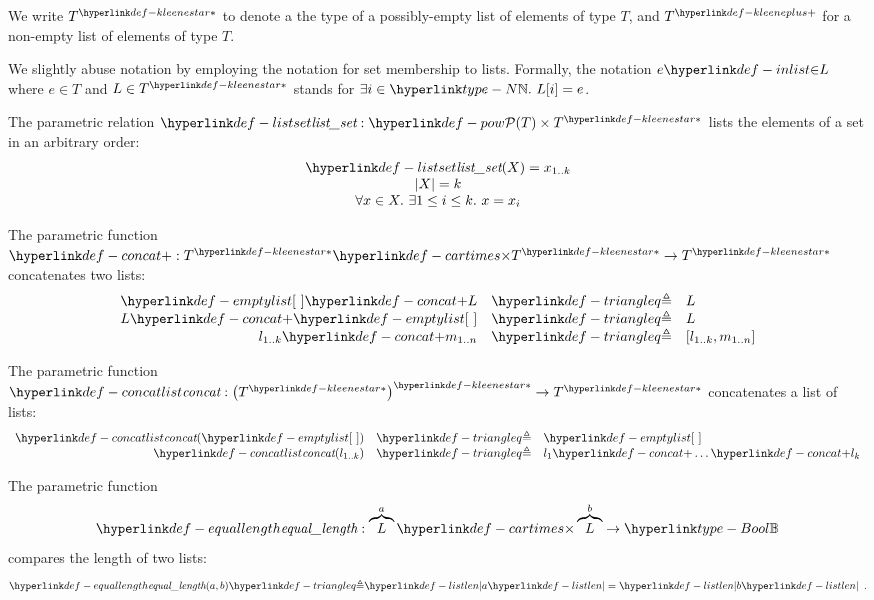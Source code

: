 \hypertarget{def-kleenestar}{}
\hypertarget{def-kleeneplus}{}
We write $\KleeneStar{T}$ to denote a the type of a possibly-empty list of elements of type $T$,
and $\KleenePlus{T}$ for a non-empty list of elements of type $T$.

\hypertarget{def-inlist}{}
We slightly abuse notation by employing the notation for set membership to lists.
Formally, the notation $e \inlist L$ where $e \in T$ and $L \in \KleeneStar{T}$ stands for $\exists i\in\N.\ L[i]=e$.

\hypertarget{def-listset}{}
\begin{definition}
The parametric relation $\listset : \pow{T} \times \KleeneStar{T}$
lists the elements of a set in an arbitrary order:
\[
\begin{array}{c}
  \listset(X) = x_{1..k}\\
  |X| = k\\
  \forall x\in X.\ \exists 1 \leq i \leq k.\ x = x_i
\end{array}
\]
\end{definition}

\hypertarget{def-concat}{}
\begin{definition}
The parametric function $\concat : \KleeneStar{T} \cartimes \KleeneStar{T} \rightarrow \KleeneStar{T}$ concatenates two lists:
\[
    \begin{array}{rcl}
    \emptylist \concat L &\triangleq& L\\
    L \concat \emptylist &\triangleq& L\\
    l_{1..k} \concat m_{1..n} &\triangleq& [l_{1..k}, m_{1..n}]
    \end{array}
\]
\end{definition}

\hypertarget{def-concatlist}{}
\begin{definition}
The parametric function\\
$\concatlist : \KleeneStar{\left(\KleeneStar{T}\right)} \rightarrow \KleeneStar{T}$ concatenates a list of lists:
\[
  \begin{array}{rcl}
    \concatlist(\emptylist) &\triangleq& \emptylist\\
    \concatlist(l_{1..k}) &\triangleq& l_1 \concat \ldots \concat l_k \\
  \end{array}
\]
\end{definition}

\hypertarget{def-equallength}{}
\begin{definition}
The parametric function
\[
  \equallength : \overname{L}{a} \cartimes \overname{L}{b} \rightarrow \Bool
\]
compares the length of two lists:
\[
\equallength(a, b) \triangleq \listlen{a}=\listlen{b} \enspace.
\]
\end{definition}

